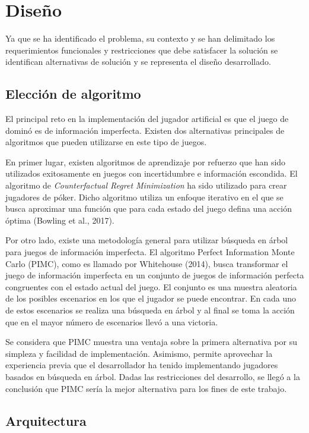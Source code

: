 \chapter{Diseño}

\noindent

Ya que se ha identificado el problema, su contexto y se han delimitado los
requerimientos funcionales y restricciones que debe satisfacer la solución se
identifican alternativas de solución y se representa el diseño desarrollado.

\section{Elección de algoritmo}

El principal reto en la implementación del jugador artificial es que el juego de
dominó es de información imperfecta. Existen dos alternativas principales de
algoritmos que pueden utilizarse en este tipo de juegos.

En primer lugar, existen algoritmos de aprendizaje por refuerzo que han sido
utilizados exitosamente en juegos con incertidumbre e información escondida. El
algoritmo de \textit{Counterfactual Regret Minimization} ha sido utilizado para
crear jugadores de póker. Dicho algoritmo utiliza un enfoque iterativo en el que
se busca aproximar una función que para cada estado del juego defina una acción
óptima (Bowling et al., 2017).

Por otro lado, existe una metodología general para utilizar búsqueda en árbol
para juegos de información imperfecta. El algoritmo Perfect Information Monte
Carlo (PIMC), como es llamado por Whitehouse (2014), busca transformar el juego
de información imperfecta en un conjunto de juegos de información perfecta
congruentes con el estado actual del juego. El conjunto es una muestra aleatoria
de los posibles escenarios en los que el jugador se puede encontrar. En cada uno
de estos escenarios se realiza una búsqueda en árbol y al final se toma la
acción que en el mayor número de escenarios llevó a una victoria.

Se considera que PIMC muestra una ventaja sobre la primera alternativa por su
simpleza y facilidad de implementación. Asimismo, permite aprovechar la
experiencia previa que el desarrollador ha tenido implementando jugadores
basados en búsqueda en árbol. Dadas las restricciones del desarrollo, se llegó a
la conclusión que PIMC sería la mejor alternativa para los fines de este
trabajo.

\section{Arquitectura}

